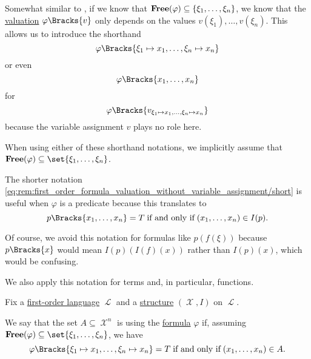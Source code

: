 \begin{remark}\label{rem:first_order_formula_valuation_without_variable_assignment}
  Somewhat similar to , if we know that \( \operatorname{\mathbf{Free}}(\varphi) \subseteq \{ \xi_1, \ldots, \xi_n \} \), we know that the \hyperref[def:first_order_valuation/formula_valuation]{valuation} \( \varphi\Bracks{v} \) only depends on the values \( v(\xi_1), \ldots, v(\xi_n) \). This allows us to introduce the shorthand
  \begin{equation}\label{eq:rem:first_order_formula_valuation_without_variable_assignment/long}
    \varphi\Bracks{\xi_1 \mapsto x_1, \ldots, \xi_n \mapsto x_n}
  \end{equation}
  or even
  \begin{equation}\label{eq:rem:first_order_formula_valuation_without_variable_assignment/short}
    \varphi\Bracks{x_1, \ldots, x_n}
  \end{equation}
  for
  \begin{equation*}
    \varphi\Bracks{v_{\xi_1 \mapsto x_1, \ldots, \xi_n \mapsto x_n}}
  \end{equation*}
  because the variable assignment \( v \) plays no role here.

  When using either of these shorthand notations, we implicitly assume that \( \boldop{Free}(\varphi) \subseteq \set{ \xi_1, \ldots, \xi_n } \).

  The shorter notation \eqref{eq:rem:first_order_formula_valuation_without_variable_assignment/short} is useful when \( \varphi \) is a predicate because this translates to
  \begin{equation*}
    p\Bracks{x_1, \ldots, x_n} = T \T{if and only if} (x_1, \ldots, x_n) \in I(p).
  \end{equation*}

  Of course, we avoid this notation for formulas like \( p(f(\xi)) \) because \( p\Bracks{x} \) would mean \( I(p)(I(f)(x)) \) rather than \( I(p)(x) \), which would be confusing.

  We also apply this notation for terms and, in particular, functions.
\end{remark}

\begin{definition}\label{def:first_order_definability}
  Fix a \hyperref[def:first_order_syntax]{first-order language} \( \mscrL \) and a \hyperref[def:first_order_structure]{structure} \( (\mscrX, I) \) on \( \mscrL \).

  We say that the set \( A \subseteq \mscrX^n \) is  using the \hyperref[def:first_order_syntax]{formula} \( \varphi \) if, assuming \( {\boldop{Free}(\varphi) \subseteq \set{ \xi_1, \ldots, \xi_n }} \), we have
  \begin{equation*}
    \varphi\Bracks{\xi_1 \mapsto x_1, \ldots, \xi_n \mapsto x_n} = T \T{if and only if} (x_1, \ldots, x_n) \in A.
  \end{equation*}
\end{definition}

